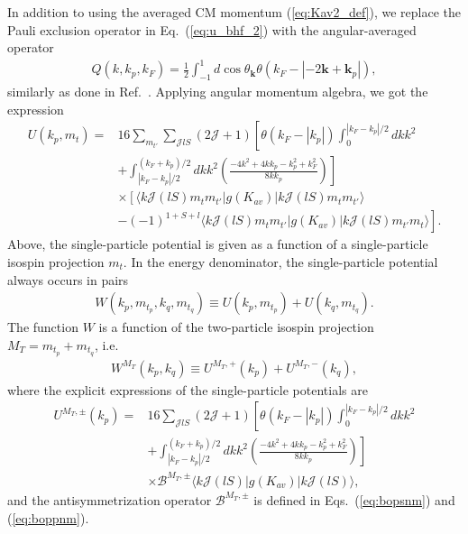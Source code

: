 \documentclass[a4paper,12pt]{report}
\begin{document}
In addition to using the averaged CM momentum (\ref{eq:Kav2_def}), we replace the Pauli exclusion operator in Eq.~(\ref{eq:u_bhf_2}) with the angular-averaged operator 
\begin{align}
  Q(k, k_{p}, k_{F}) = \frac{1}{2}\int_{-1}^{1}d\cos \theta_{\mathbf{k}} \theta(k_{F} - |-2\mathbf{k} + \mathbf{k}_{p}|),
\end{align}
similarly as done in Ref.~\cite{haftel_tabakin}. Applying angular momentum algebra, we got the expression
\begin{align}
  U(k_{p}, m_{t}) = & 16\sum_{m_{t'}}\sum_{\mathcal{J}lS}(2\mathcal{J} + 1) \left[ \theta(k_{F}-|k_{p}|)\int_{0}^{|k_{F}-k_{p}|/2}dk k^{2} \right. \nonumber \\
    & \left. + \int_{|k_{F}-k_{p}|/2}^{(k_{F}+k_{p})/2}dk k^{2} \left( \frac{-4k^{2}+4kk_{p}-k_{p}^{2}+k_{F}^{2}}{8kk_{p}}\right) \right] \nonumber \\
  & \times \left[ \langle k\mathcal{J}(lS)m_{t}m_{t'}|g(K_{av})|k\mathcal{J}(lS)m_{t}m_{t'}\rangle \right. \nonumber \\
    & \left. - (-1)^{1+S+l} \langle k\mathcal{J}(lS)m_{t}m_{t'}|g(K_{av})|k\mathcal{J}(lS)m_{t'}m_{t}\rangle \right]. 
\end{align}
Above, the single-particle potential is given as a function of a single-particle isospin projection $m_{t}$. In the energy denominator, the single-particle potential always occurs in pairs
\begin{align}
  W(k_{p}, m_{t_{p}}, k_{q}, m_{t_{q}}) \equiv U(k_{p}, m_{t_{p}}) + U(k_{q}, m_{t_{q}}).
\end{align}
The function $W$ is a function of the two-particle isospin projection $M_{T} = m_{t_{p}} + m_{t_{q}}$, i.e.
\begin{align}
  W^{M_{T}}(k_{p}, k_{q}) \equiv U^{M_{T}, +}(k_{p}) + U^{M_{T}, -}(k_{q}),
  \label{eq:wiso}
\end{align}
where the explicit expressions of the single-particle potentials are 
\begin{align}
  U^{M_{T}, \pm }(k_{p}) = &16 \sum_{\mathcal{J}lS}(2\mathcal{J} + 1) \left[ \theta(k_{F} - |k_{p}|) \int_{0}^{|k_{F}-k_{p}|/2}dk k^{2} \right. \nonumber \\
    & \left. + \int_{|k_{F}-k_{p}|/2}^{(k_{F}+k_{p})/2}dk k^{2} \left( \frac{-4k^{2} + 4kk_{p} - k_{p}^{2} + k_{F}^{2}}{8kk_{p}}\right) \right] \nonumber \\
  & \times \mathcal{B}^{M_{T}, \pm }\langle k\mathcal{J}(lS)|g(K_{av})|k\mathcal{J}(lS)\rangle ,
  \label{eq:uiso}
\end{align}
and the antisymmetrization operator $\mathcal{B}^{M_{T}, \pm }$ is defined in
Eqs.~(\ref{eq:bopsnm}) and (\ref{eq:boppnm}). 
\end{document}
